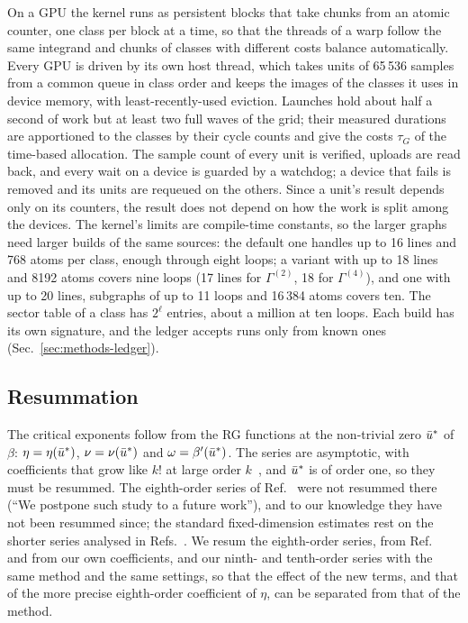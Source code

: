 On a GPU the kernel runs as persistent blocks that take chunks from an atomic counter, one class per block at a time, so
that the threads of a warp follow the same integrand and chunks of classes with different costs balance automatically.
Every GPU is driven by its own host thread, which takes units of 65\,536 samples from a common queue in class order and
keeps the images of the classes it uses in device memory, with least-recently-used eviction. Launches hold about half a
second of work but at least two full waves of the grid; their measured durations are apportioned to the classes by their
cycle counts and give the costs $\tau_G$ of the time-based allocation. The sample count of every unit is verified, uploads
are read back, and every wait on a device is guarded by a watchdog; a device that fails is removed and its units are
requeued on the others. Since a unit's result depends only on its counters, the result does not depend on how the work is
split among the devices. The kernel's limits are compile-time constants, so the larger graphs need larger builds of the
same sources: the default one handles up to 16 lines and 768 atoms per class, enough through eight loops; a variant with
up to 18 lines and 8192 atoms covers nine loops (17 lines for $\Gamma^{(2)}$, 18 for $\Gamma^{(4)}$), and one with up to
20 lines, subgraphs of up to 11 loops and 16\,384 atoms covers ten. The sector table of a class has $2^\ell$ entries,
about a million at ten loops. Each build has its own signature, and the ledger accepts runs only from known
ones (Sec.~\ref{sec:methods-ledger}).

\subsection{Resummation}
\label{sec:methods-resummation}

The critical exponents follow from the RG functions at the non-trivial zero $\bar u^*$ of $\beta$: $\eta=\eta(\bar u^*)$, $\nu=\nu(\bar u^*)$ and $\omega=\beta'(\bar u^*)$. The series are asymptotic, with
coefficients that grow like $k!$ at large order $k$~\cite{Lipatov1977,BrezinLeGuillouZinnJustin1977}, and $\bar u^*$
is of order one, so they must be resummed. The eighth-order series of Ref.~\cite{Phi4tools2024} were not resummed
there (``We postpone such study to a future work''), and to our knowledge they have not been resummed since; the
standard fixed-dimension estimates rest on the shorter series analysed in
Refs.~\cite{LeGuillouZinnJustin1977,LeGuillouZinnJustin1980,GuidaZinnJustin1998}. We resum the eighth-order series,
from Ref.~\cite{Phi4tools2024} and from our own coefficients, and our ninth- and tenth-order series with the same
method and the same settings, so that the effect of the new terms, and that of the more precise eighth-order
coefficient of $\eta$, can be separated from that of the method.

